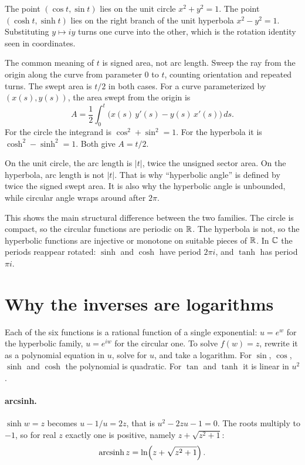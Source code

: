 \documentclass{essay}
\begin{document}
The point $(\cos t, \sin t)$ lies on the unit circle $x^2 + y^2 = 1$. The point
$(\cosh t, \sinh t)$ lies on the right branch of the unit hyperbola
$x^2 - y^2 = 1$. Substituting $y \mapsto iy$ turns one curve into the other,
which is the rotation identity seen in coordinates.

The common meaning of $t$ is signed area, not arc length. Sweep the ray from
the origin along the curve from parameter $0$ to $t$, counting orientation and
repeated turns. The swept area is $t/2$ in both cases. For a curve parameterized by
$(x(s), y(s))$, the area swept from the origin is
\[
  A = \frac{1}{2} \int_0^t \bigl( x(s)\,y'(s) - y(s)\,x'(s) \bigr)\, ds .
\]
For the circle the integrand is $\cos^2 + \sin^2 = 1$. For the hyperbola it is
$\cosh^2 - \sinh^2 = 1$. Both give $A = t/2$.

On the unit circle, the arc length is $|t|$, twice the unsigned sector area.
On the hyperbola, arc length is not $|t|$. That is why ``hyperbolic angle'' is
defined by twice the signed swept area. It is also why the
hyperbolic angle is unbounded, while circular angle wraps around after $2\pi$.

This shows the main structural difference between the two families. The circle
is compact, so the circular functions are periodic on $\mathbb{R}$. The hyperbola is
not, so the hyperbolic functions are injective or monotone on suitable pieces
of $\mathbb{R}$. In $\mathbb{C}$ the periods reappear rotated: $\sinh$ and $\cosh$ have period
$2\pi i$, and $\tanh$ has period $\pi i$.

\section{Why the inverses are logarithms}

Each of the six functions is a rational function of a single exponential:
$u = e^w$ for the hyperbolic family, $u = e^{iw}$ for the circular one. To solve
$f(w) = z$, rewrite it as a polynomial equation in $u$, solve for $u$, and take
a logarithm. For $\sin$, $\cos$, $\sinh$ and $\cosh$ the polynomial is
quadratic. For $\tan$ and $\tanh$ it is linear in $u^2$.

\paragraph{arcsinh.}
$\sinh w = z$ becomes $u - 1/u = 2z$, that is $u^2 - 2zu - 1 = 0$. The roots
multiply to $-1$, so for real $z$ exactly one is positive, namely
$z + \sqrt{z^2 + 1}$:
\[
  \operatorname{arcsinh} z = \ln\!\left( z + \sqrt{z^2 + 1} \right).
\]
\end{document}
